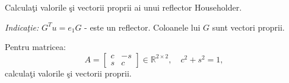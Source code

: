 \documentclass{exam}
\begin{document}
\begin{questions}
	\question
	Calculaţi valorile şi vectorii proprii ai unui reflector Householder.

	\emph{Indicaţie:} $G^T u = e_1G$  - este un reflector. Coloanele lui $G$ sunt vectori proprii.

	\question
	Pentru matricea:
	\[
		A = \begin{bmatrix}
			c & -s \\
			s & c
		\end{bmatrix}
		\in \mathbb{R}^{2 \times 2}, \quad c^2 + s^2 = 1,
	\]
	calculaţi valorile şi vectorii proprii.
\end{questions}
\end{document}
